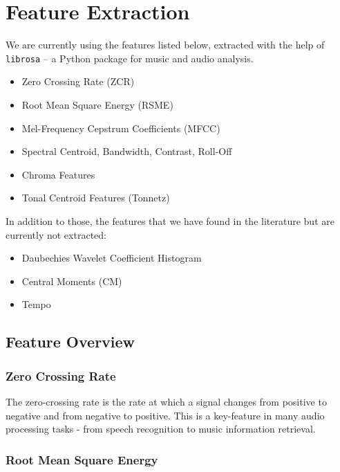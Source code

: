 \section{Feature Extraction}

We are currently using the features listed below, extracted with the help of \texttt{librosa} \cite{McFee2015} -- a Python package for music and audio analysis.

\begin{itemize}
    \item Zero Crossing Rate (ZCR) \cite{Li2006}
    \item Root Mean Square Energy (RSME) \cite{Tao}
    \item Mel-Frequency Cepstrum Coefficients (MFCC) \cite{Li2006, Nanni2016, Hoffmann2016, Lim2012}
    \item Spectral Centroid, Bandwidth, Contrast, Roll-Off \cite{Li2006, Li2005}
    \item Chroma Features
    \item Tonal Centroid Features (Tonnetz) \cite{Harte2006}
\end{itemize}

In addition to those, the features that we have found in the literature but are currently not extracted:

\begin{itemize}
    \item Daubechies Wavelet Coefficient Histogram \cite{Li2006}
    \item Central Moments (CM)
    \item Tempo
\end{itemize}

\subsection{Feature Overview}

\subsubsection{Zero Crossing Rate}

The zero-crossing rate is the rate at which a signal changes from positive to negative and from negative to positive. This is a key-feature in many audio processing tasks - from speech recognition to music information retrieval.

\subsubsection{Root Mean Square Energy}

